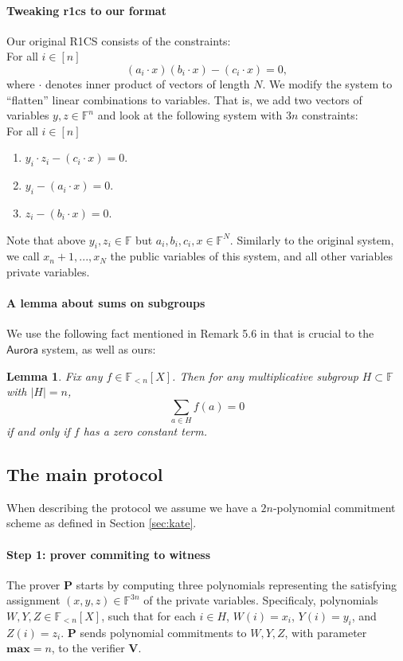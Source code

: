 \documentclass[11pt]{article}
\numberwithin{figure}{section} %
\newtheorem{lemma}[thm]{Lemma}
\renewcommand{\max}{\ensuremath{\mathrm{\mathbf{max}}}\xspace}
\newcommand{\summa}{\ensuremath{\sum_{a\in H}}\xspace}
\newcommand{\F}{\ensuremath{\mathbb F}\xspace}
\newcommand{\prv}{\ensuremath{\mathsf{\mathbf{P}}}\xspace}
\newcommand{\ver}{\ensuremath{\mathsf{\mathbf{V}}}\xspace}
\newcommand{\aurora}{\ensuremath{\mathsf{Aurora}}\xspace}
\newcommand{\polysofdeg}[1]{\ensuremath{\F_{< #1}[X]}\xspace}
\begin{document}
\paragraph{Tweaking r1cs to our format}
Our original R1CS consists of the constraints:\\
For all $i\in [n]$
\[(a_i\cdot x)(b_i\cdot x) - (c_i\cdot x) = 0,\]
where $\cdot$ denotes inner product of vectors of length $N$. We modify the system to “flatten” linear combinations to variables. That is, we add two vectors of variables $y, z\in  \F^n$ and look at the following system with $3n$ constraints:\\
\noindent
For all $i\in [n]$
\begin{enumerate}
\item  $y_i\cdot z_i - (c_i\cdot x) = 0$.
\item $y_i - (a_i\cdot x) = 0$.
\item $z_i - (b_i\cdot x) = 0$.
\end{enumerate}
Note that above $y_i, z_i\in\F$ but $a_i,b_i,c_i,x \in\F^N$.
Similarly to the original system, we call
$x_n+1, . . . , x_N$ the public variables of this system, and all other variables private variables.

\paragraph{A lemma about sums on subgroups}
We use the following fact mentioned in Remark 5.6 in \cite{aurora} that is crucial to the \aurora system, as well as ours:
\begin{lemma}\label{lem:sumcoeff}
Fix any $f\in\polysofdeg{n}$. Then for any multiplicative subgroup $H\subset \F$ with $|H| = n$,
\[\summa f(a) = 0\]
if and only if $f$ has a zero constant term. 
\end{lemma}

\subsection{The main protocol}
When describing the protocol we assume we have a $2n$-polynomial commitment scheme as defined in Section \ref{sec:kate}.

\paragraph{Step 1: prover commiting to witness}
The prover \prv starts by computing three polynomials representing the satisfying assignment $(x, y, z) \in\F^{3n}$ of the private variables. Specificaly, polynomials $W, Y, Z \in \polysofdeg{n}$, such that for each $i\in H$,
$W(i) = x_i$, $Y (i) = y_i$, and $Z(i) = z_i$.
\prv sends polynomial commitments to $W, Y, Z$, with parameter $\max=n$, to the verifier \ver.
\end{document}
